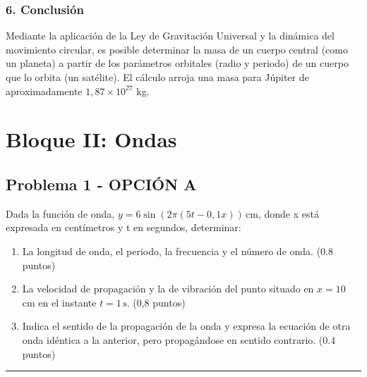 \subsubsection*{6. Conclusión}
\begin{cajaconclusion}
Mediante la aplicación de la Ley de Gravitación Universal y la dinámica del movimiento circular, es posible determinar la masa de un cuerpo central (como un planeta) a partir de los parámetros orbitales (radio y periodo) de un cuerpo que lo orbita (un satélite). El cálculo arroja una masa para Júpiter de aproximadamente $1,87 \times 10^{27}$ kg.
\end{cajaconclusion}

\newpage

\section{Bloque II: Ondas}
\label{sec:ondas_2001_sep_ext}

\subsection{Problema 1 - OPCIÓN A}
\label{subsec:2A_2001_sep_ext}

\begin{cajaenunciado}
Dada la función de onda, $y=6\sin(2\pi (5t-0,1x))\,\text{cm}$, donde x está expresada en centímetros y t en segundos, determinar:
\begin{enumerate}
    \item La longitud de onda, el periodo, la frecuencia y el número de onda. (0.8 puntos)
    \item La velocidad de propagación y la de vibración del punto situado en $x=10$ cm en el instante $t=1\,\text{s}$. (0,8 puntos)
    \item Indica el sentido de la propagación de la onda y expresa la ecuación de otra onda idéntica a la anterior, pero propagándose en sentido contrario. (0.4 puntos)
\end{enumerate}
\end{cajaenunciado}
\hrule

